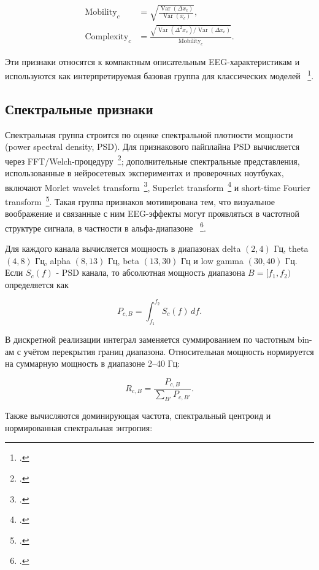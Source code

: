\begin{align}
\operatorname{Mobility}_c &=
\sqrt{\frac{\operatorname{Var}(\Delta x_c)}
{\operatorname{Var}(x_c)}}, \\
\operatorname{Complexity}_c &=
\frac{
\sqrt{\operatorname{Var}(\Delta^2 x_c) /
\operatorname{Var}(\Delta x_c)}
}{
\operatorname{Mobility}_c
}.
\end{align}

Эти признаки относятся к компактным описательным EEG-характеристикам и
используются как интерпретируемая базовая группа для классических моделей
~\footcite{10.1088/1741-2552/aab2f2}.

\subsection*{Спектральные признаки}

Спектральная группа строится по оценке спектральной плотности мощности
(power spectral density, PSD). Для признакового пайплайна PSD вычисляется
через FFT/Welch-процедуру~\footcite{10.1109/TAU.1967.1161901}; дополнительные
спектральные представления, использованные в нейросетевых экспериментах и
проверочных ноутбуках, включают Morlet wavelet transform~\footcite{10.1137/0515056},
Superlet transform~\footcite{10.1038/s41467-020-20539-9} и short-time Fourier
transform~\footcite{gabor1946theory}. Такая группа признаков мотивирована тем,
что визуальное воображение и связанные с ним EEG-эффекты могут проявляться
в частотной структуре сигнала, в частности в альфа-диапазоне
~\footcite{10.1016/j.cub.2020.04.074}.

Для каждого канала вычисляется мощность в диапазонах
delta $(2,4)$ Гц, theta $(4,8)$ Гц, alpha $(8,13)$ Гц,
beta $(13,30)$ Гц и low gamma $(30,40)$ Гц. Если $S_c(f)$ - PSD канала,
то абсолютная мощность диапазона $B=[f_1,f_2)$ определяется как

\begin{equation}
P_{c,B} = \int_{f_1}^{f_2} S_c(f)\,df.
\end{equation}

В дискретной реализации интеграл заменяется суммированием по частотным
bin-ам с учётом перекрытия границ диапазона. Относительная мощность
нормируется на суммарную мощность в диапазоне 2--40 Гц:

\begin{equation}
R_{c,B} =
\frac{P_{c,B}}{\sum_{B'} P_{c,B'}}.
\end{equation}

Также вычисляются доминирующая частота, спектральный центроид и
нормированная спектральная энтропия:

